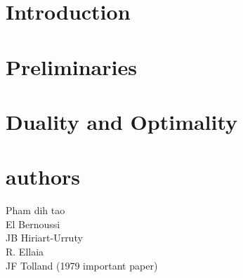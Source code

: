 
\newcommand{\citeauthorandyear}[2][]{
   \citeauthor{#2} (\citeyear[#1]{#2})
}
\newcommand{\argmin}{\mathrm{argmin}}

 

\pagestyle{fancy}	

\section{Introduction}

\clearpage
\section{Preliminaries}

\clearpage
\section{Duality and Optimality}

\clearpage
\appendix
	
\clearpage
\printbibliography
\clearpage
\section{authors}
Pham dih tao\\
El Bernoussi\\
JB Hiriart-Urruty\\
R. Ellaia\\
JF Tolland (1979 important paper)


